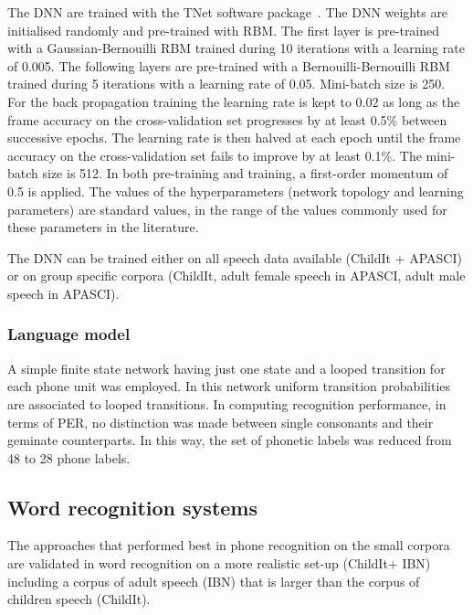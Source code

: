 \documentclass{nle}
\begin{document}
The DNN are trained with the TNet software package~\citep*{vesely10}. The DNN weights are initialised randomly and pre-trained with RBM. The first layer is pre-trained with a Gaussian-Bernouilli RBM trained during 10 iterations with a learning rate of 0.005. The following layers are pre-trained with a Bernouilli-Bernouilli RBM trained during 5 iterations with a learning rate of 0.05. Mini-batch size is 250. For the back propagation training the learning rate is kept to 0.02 as long as the frame accuracy on the cross-validation set progresses by at least 0.5\% between successive epochs. The learning rate is then halved at each epoch until the frame accuracy on the cross-validation set fails to improve by at least 0.1\%. The mini-batch size is 512. In both pre-training and training, a first-order momentum of 0.5 is applied. The values of the hyperparameters (network topology and learning parameters) are standard values, in the range of the values commonly used for these parameters in the literature.

The DNN can be trained either on all speech data available  (ChildIt + APASCI) or on group specific corpora (ChildIt, adult female speech in APASCI, adult male speech in APASCI).

\subsubsection{Language model}
A simple finite state network having  just one state and a  looped transition for each
phone  unit   was  employed.   In  this   network  uniform  transition
probabilities  are  associated to  looped  transitions.  In  computing
recognition  performance,  in terms  of  PER,  no
distinction  was made  between  single consonants  and their  geminate
counterparts.  In this way, the  set of phonetic labels was reduced
from 48 to 28 phone labels.  




\subsection{Word recognition systems}
The approaches that performed best in phone recognition on the small corpora are validated in word recognition on a more realistic set-up (ChildIt+ IBN) including a corpus of adult speech (IBN) that is larger than the corpus of children speech (ChildIt).
\end{document}
